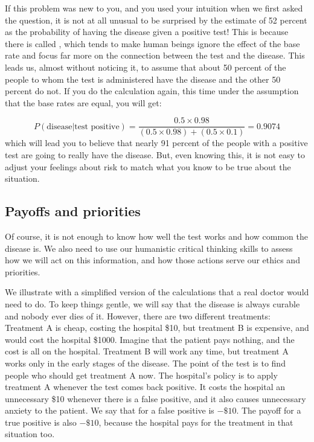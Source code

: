 If this problem was new to you, and you used your intuition when we first asked the question,
 it is not at all unusual to be surprised by the estimate of 52 percent as the 
probability of having the disease given a positive test!  
 This is because there is  called , which tends to make human beings
ignore the effect of the base rate and focus far more on the connection between the test and the disease. This leads us, almost without noticing it, to assume that about 50 percent of the
people 
to whom the test is administered have the disease and the other 50 percent do not. 
If you do the calculation again, this time under the assumption that the base rates are equal, you will get:

\begin{equation}
P(\mbox{disease}|\mbox{test positive}) = \frac{0.5\times 0.98}{(0.5 \times 0.98) + (0.5 \times 0.1)} =  0.9074
\end{equation}
which will lead you to believe that nearly 91 percent of the people with a positive test are
going to really have the disease. But, even knowing this, it is not easy to adjust your feelings
about risk to match what you know to be true about  the situation.


\subsection{Payoffs and priorities}

Of course, it is not enough to know how well the test works and how common the disease is. We also need to use our humanistic critical thinking skills to assess how we will act on this information, and how those actions serve our ethics and priorities.

We illustrate with a simplified version of the calculations that a real doctor would need to do. To keep things gentle, we will say that the disease is always
curable and nobody ever dies of it. However, there are two different
treatments: Treatment A is cheap, costing the hospital \$10, but
treatment B is expensive, and would cost the hospital \$1000. 
Imagine that
the patient pays nothing, and the cost is all on the hospital.
Treatment B will work any time, but treatment A works only in the
early stages of the disease. The point of the test is to find people
who should get treatment A now. The hospital's policy is to apply
treatment A whenever the test comes back positive. It costs the
hospital an unnecessary \$10 whenever there is a false positive, and it also causes unnecessary anxiety to the patient. We
say that  for a false positive is $-\$10$. The payoff
for a true positive is also $-\$10$, because the hospital pays for the
treatment in that situation too.

